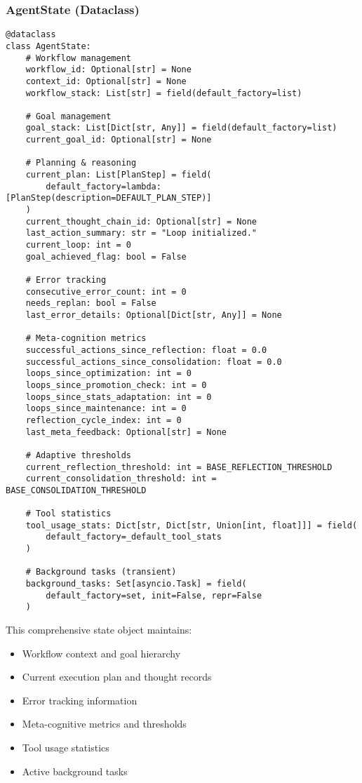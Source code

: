 \documentclass[12pt,a4paper]{article}
\begin{document}
\subsubsection*{AgentState (Dataclass)}
\begin{pageablecode}
\begin{verbatim}
@dataclass
class AgentState:
    # Workflow management
    workflow_id: Optional[str] = None
    context_id: Optional[str] = None
    workflow_stack: List[str] = field(default_factory=list)

    # Goal management
    goal_stack: List[Dict[str, Any]] = field(default_factory=list)
    current_goal_id: Optional[str] = None

    # Planning & reasoning
    current_plan: List[PlanStep] = field(
        default_factory=lambda: [PlanStep(description=DEFAULT_PLAN_STEP)]
    )
    current_thought_chain_id: Optional[str] = None
    last_action_summary: str = "Loop initialized."
    current_loop: int = 0
    goal_achieved_flag: bool = False

    # Error tracking
    consecutive_error_count: int = 0
    needs_replan: bool = False
    last_error_details: Optional[Dict[str, Any]] = None

    # Meta-cognition metrics
    successful_actions_since_reflection: float = 0.0
    successful_actions_since_consolidation: float = 0.0
    loops_since_optimization: int = 0
    loops_since_promotion_check: int = 0
    loops_since_stats_adaptation: int = 0
    loops_since_maintenance: int = 0
    reflection_cycle_index: int = 0
    last_meta_feedback: Optional[str] = None

    # Adaptive thresholds
    current_reflection_threshold: int = BASE_REFLECTION_THRESHOLD
    current_consolidation_threshold: int = BASE_CONSOLIDATION_THRESHOLD

    # Tool statistics
    tool_usage_stats: Dict[str, Dict[str, Union[int, float]]] = field(
        default_factory=_default_tool_stats
    )

    # Background tasks (transient)
    background_tasks: Set[asyncio.Task] = field(
        default_factory=set, init=False, repr=False
    )
\end{verbatim}
\end{pageablecode}
This comprehensive state object maintains:
\begin{itemize}
    \item Workflow context and goal hierarchy
    \item Current execution plan and thought records
    \item Error tracking information
    \item Meta-cognitive metrics and thresholds
    \item Tool usage statistics
    \item Active background tasks
\end{itemize}
\end{document}
